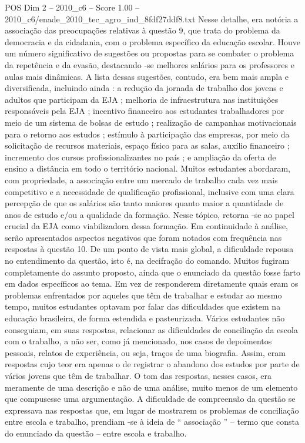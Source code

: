 \begin{textsample}{POS Dim 2 – 2010\_c6 – Score 1.00 – 2010\_c6/enade\_2010\_tec\_agro\_ind\_8fdf27ddf8.txt}
Nesse detalhe, era notória a associação das preocupações relativas à questão 9, que trata do problema da democracia e da cidadania, com o problema específico da educação escolar.
Houve um número significativo de sugestões ou propostas para se combater o problema da repetência e da evasão, destacando -se melhores salários para os professores e aulas mais dinâmicas.
A lista dessas sugestões, contudo, era bem mais ampla e diversificada, incluindo ainda : a redução da jornada de trabalho dos jovens e adultos que participam da EJA ; melhoria de infraestrutura nas instituições responsáveis pela EJA ; incentivo financeiro aos estudantes trabalhadores por meio de um sistema de bolsas de estudo ; realização de campanhas motivacionais para o retorno aos estudos ; estímulo à participação das empresas, por meio da solicitação de recursos materiais, espaço físico para as salas, auxílio financeiro ; incremento dos cursos profissionalizantes no país ; e ampliação da oferta de ensino a distância em todo o território nacional.
Muitos estudantes abordaram, com propriedade, a associação entre um mercado de trabalho cada vez mais competitivo e a necessidade de qualificação profissional, inclusive com uma clara percepção de que os salários são tanto maiores quanto maior a quantidade de anos de estudo e/ou a qualidade da formação.
Nesse tópico, retorna -se ao papel crucial da EJA como viabilizadora dessa formação.
Em continuidade à análise, serão apresentados aspectos negativos que foram notados com frequência nas respostas à questão 10.
De um ponto de vista mais global, a dificuldade repousa no entendimento da questão, isto é, na decifração do comando.
Muitos fugiram completamente do assunto proposto, ainda que o enunciado da questão fosse farto em dados específicos ao tema.
Em vez de responderem diretamente quais eram os problemas enfrentados por aqueles que têm de trabalhar e estudar ao mesmo tempo, muitos estudantes optavam por falar das dificuldades que existem na educação brasileira, de forma estendida e pasteurizada.
Vários estudantes não conseguiam, em suas respostas, relacionar as dificuldades de conciliação da escola com o trabalho, a não ser, como já mencionado, nos casos de depoimentos pessoais, relatos de experiência, ou seja, traços de uma biografia.
Assim, eram respostas cujo teor era apenas o de registrar o abandono dos estudos por parte de vários jovens que têm de trabalhar.
O tom das respostas, nesses casos, era meramente de uma descrição e não de uma análise, muito menos de um elemento que compusesse uma argumentação.
A dificuldade de compreensão da questão se expressava nas respostas que, em lugar de mostrarem os problemas de conciliação entre escola e trabalho, prendiam -se à ideia de “ associação ” – termo que consta do enunciado da questão – entre escola e trabalho.

\end{textsample}
